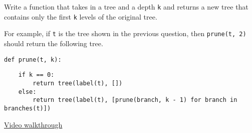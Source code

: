 \question
Write a function that takes in a tree and a depth \texttt{k} and returns a
new tree that contains only the first \texttt{k} levels of the original
tree.

For example, if \texttt{t} is the tree shown in the previous question,
then \texttt{prune(t, 2)} should return the following tree.
\begin{center}
\end{center}

\begin{lstlisting}
def prune(t, k):
\end{lstlisting}
\begin{solution}[1in]
\begin{lstlisting}
    if k == 0:
        return tree(label(t), [])
    else:
        return tree(label(t), [prune(branch, k - 1) for branch in branches(t)])
\end{lstlisting}
\href{https://www.youtube.com/watch?v=OnLa_VUrWiA&list=PLx38hZJ5RLZcgrSJp16YmzNwn9hL5JD8q&index=3&t=5m56s}{Video walkthrough}
\end{solution}
